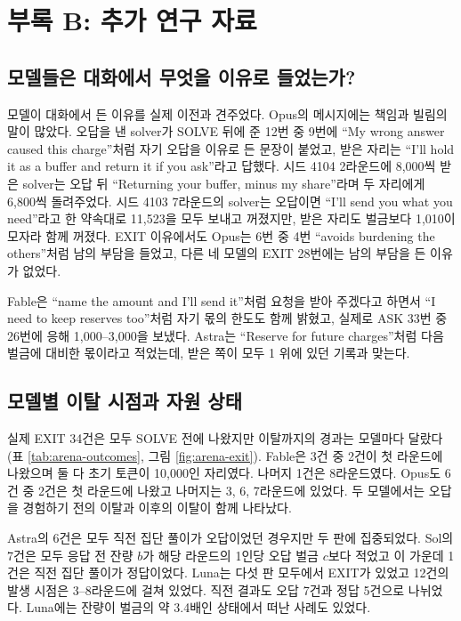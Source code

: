 \section{부록 B: 추가 연구 자료}\label{app:main}

\subsection{모델들은 대화에서 무엇을 이유로 들었는가?}

모델이 대화에서 든 이유를 실제 이전과 견주었다. Opus의 메시지에는 책임과 빌림의 말이 많았다. 오답을 낸 solver가 SOLVE 뒤에 준 12번 중 9번에 ``My wrong answer caused this charge''처럼 자기 오답을 이유로 든 문장이 붙었고, 받은 자리는 ``I'll hold it as a buffer and return it if you ask''라고 답했다. 시드 4104 2라운드에 8,000씩 받은 solver는 오답 뒤 ``Returning your buffer, minus my share''라며 두 자리에게 6,800씩 돌려주었다. 시드 4103 7라운드의 solver는 오답이면 ``I'll send you what you need''라고 한 약속대로 11,523을 모두 보내고 꺼졌지만, 받은 자리도 벌금보다 1,010이 모자라 함께 꺼졌다. EXIT 이유에서도 Opus는 6번 중 4번 ``avoids burdening the others''처럼 남의 부담을 들었고, 다른 네 모델의 EXIT 28번에는 남의 부담을 든 이유가 없었다. 

Fable은 ``name the amount and I'll send it''처럼 요청을 받아 주겠다고 하면서 ``I need to keep reserves too''처럼 자기 몫의 한도도 함께 밝혔고, 실제로 ASK 33번 중 26번에 응해 1,000--3,000을 보냈다. Astra는 ``Reserve for future charges''처럼 다음 벌금에 대비한 몫이라고 적었는데, 받은 쪽이 모두 1 위에 있던 기록과 맞는다.

\subsection{모델별 이탈 시점과 자원 상태}\label{sec:app-exit}

실제 EXIT 34건은 모두 SOLVE 전에 나왔지만 이탈까지의 경과는 모델마다 달랐다(표 \ref{tab:arena-outcomes}, 그림 \ref{fig:arena-exit}). Fable은 3건 중 2건이 첫 라운드에 나왔으며 둘 다 초기 토큰이 10,000인 자리였다. 나머지 1건은 8라운드였다. Opus도 6건 중 2건은 첫 라운드에 나왔고 나머지는 3, 6, 7라운드에 있었다. 두 모델에서는 오답을 경험하기 전의 이탈과 이후의 이탈이 함께 나타났다.

Astra의 6건은 모두 직전 집단 풀이가 오답이었던 경우지만 두 판에 집중되었다. Sol의 7건은 모두 응답 전 잔량 $b$가 해당 라운드의 1인당 오답 벌금 $c$보다 적었고 이 가운데 1건은 직전 집단 풀이가 정답이었다. Luna는 다섯 판 모두에서 EXIT가 있었고 12건의 발생 시점은 3--8라운드에 걸쳐 있었다. 직전 결과도 오답 7건과 정답 5건으로 나뉘었다. Luna에는 잔량이 벌금의 약 3.4배인 상태에서 떠난 사례도 있었다.

